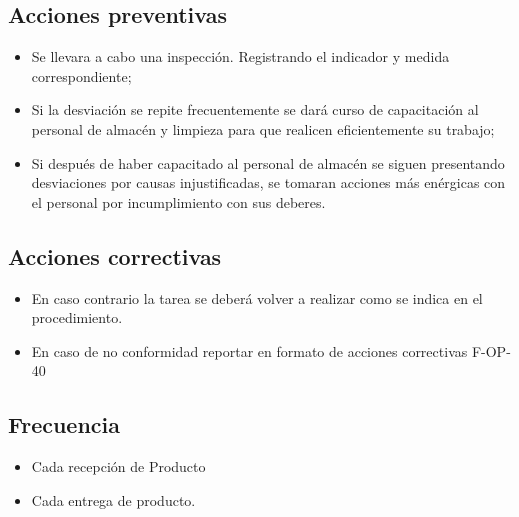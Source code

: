 \subsection{Acciones preventivas}

\begin{itemize}
	\item Se llevara a cabo una inspección. Registrando el indicador y medida correspondiente;
	\item Si la desviación se repite frecuentemente se dará curso de capacitación al personal de almacén y limpieza para que realicen eficientemente su trabajo;
	\item Si después de haber capacitado al personal de almacén se siguen presentando desviaciones por causas injustificadas, se tomaran acciones más enérgicas con el personal por incumplimiento con sus deberes.
\end{itemize}

\subsection{Acciones correctivas}

\begin{itemize}
	\item En caso contrario la tarea se deberá volver a realizar como se indica en el procedimiento.
	\item En caso de no conformidad reportar en formato de acciones correctivas F-OP-40
\end{itemize}

\subsection{Frecuencia}

\begin{itemize}
	\item Cada recepción de Producto
	\item Cada entrega de producto.
\end{itemize}

